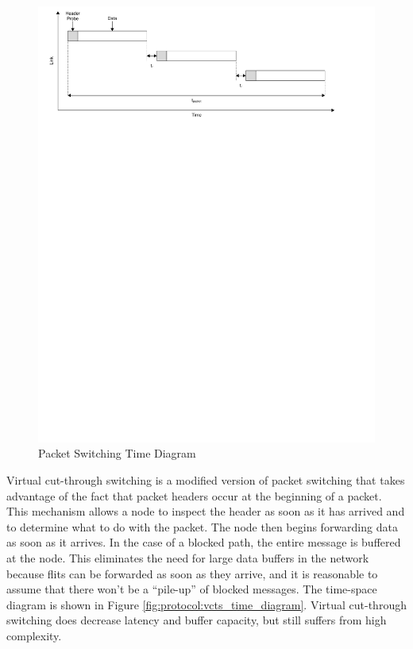 \begin{figure}[ptb]
	\begin{centering}
		\includegraphics[scale=0.8]{Protocol/Figures/protocol-ps_time_diagram.pdf}
		\caption[Packet Switching Time Diagram]{Packet Switching Time Diagram \cite{ref:1997-duato-interconnection_networks}}
		\label{fig:protocol:ps_time_diagram}
	\end{centering}
\end{figure}

Virtual cut-through switching is a modified version of packet switching that takes advantage of the fact that packet headers occur at the beginning of a packet. This mechanism allows a node to inspect the header as soon as it has arrived and to determine what to do with the packet. The node then begins forwarding data as soon as it arrives. In the case of a blocked path, the entire message is buffered at the node. This eliminates the need for large data buffers in the network because flits can be forwarded as soon as they arrive, and it is reasonable to assume that there won't be a ``pile-up'' of blocked messages. The time-space diagram is shown in Figure \ref{fig:protocol:vcts_time_diagram}. Virtual cut-through switching does decrease latency and buffer capacity, but still suffers from high complexity. \cite{ref:1997-duato-interconnection_networks}

